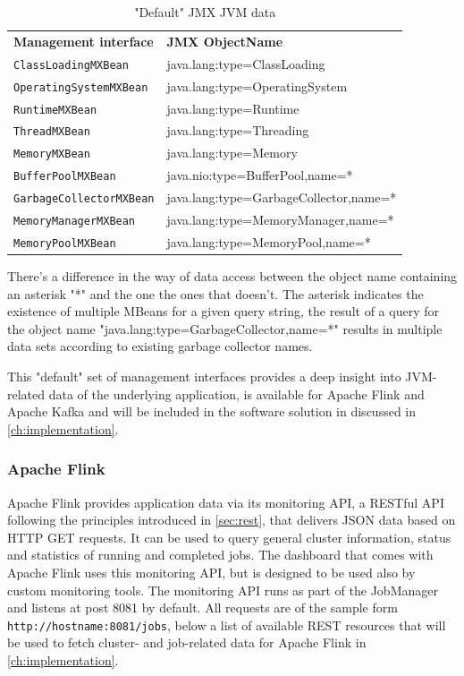 \begin{table}[H]
    \begin{tabular}{ll}
        \textbf{Management interface} & \textbf{JMX ObjectName} \\
        \verb|ClassLoadingMXBean| & java.lang:type=ClassLoading \\
        \verb|OperatingSystemMXBean| & java.lang:type=OperatingSystem \\
        \verb|RuntimeMXBean| & java.lang:type=Runtime \\
        \verb|ThreadMXBean| & java.lang:type=Threading \\
        \verb|MemoryMXBean| & java.lang:type=Memory \\
        \verb|BufferPoolMXBean|& java.nio:type=BufferPool,name=* \\
        \verb|GarbageCollectorMXBean| & java.lang:type=GarbageCollector,name=* \\
        \verb|MemoryManagerMXBean| & java.lang:type=MemoryManager,name=* \\
        \verb|MemoryPoolMXBean| & java.lang:type=MemoryPool,name=* \\
    \end{tabular}
    \caption{"Default" JMX JVM data}
    \label{tbl:jmxjvmdata}
\end{table}

There's a difference in the way of data access between the object name containing an asterisk "*"
and the one the ones that doesn't. The asterisk indicates the existence of multiple MBeans for a given query string,
the result of a query for the object name "java.lang:type=GarbageCollector,name=*" results in multiple data sets according
to existing garbage collector names.

This "default" set of management interfaces provides a deep insight into JVM-related data of the underlying application, is
available for Apache Flink and Apache Kafka and will be included in the software solution
in discussed in \autoref{ch:implementation}.

\subsubsection{Apache Flink}

Apache Flink provides application data via its monitoring API, a RESTful API following the principles introduced in \autoref{sec:rest},
 that delivers JSON data based on HTTP
GET requests. It can be used to query general cluster information, status and
statistics of running and completed jobs. The dashboard that comes with Apache Flink
uses this monitoring API, but is designed to be used also by custom monitoring tools. The
monitoring API runs as part of the JobManager and listens at post 8081 by default. All requests
are of the sample form \verb|http://hostname:8081/jobs|, below a list of available REST resources that
will be used to fetch cluster- and job-related data for Apache Flink in \autoref{ch:implementation}.

